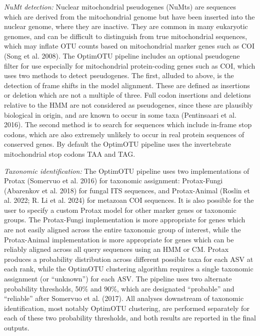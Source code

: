 \documentclass[
]{article}
\begin{document}
\emph{NuMt detection:}
Nuclear mitochondrial pseudogenes (NuMts) are sequences which are derived from the mitochondrial genome but have been inserted into the nuclear genome, where they are inactive.
They are common in many eukaryotic genomes, and can be difficult to distinguish from true mitochondrial sequences, which may inflate OTU counts based on mitochondrial marker genes such as COI (Song et al. 2008).
The OptimOTU pipeline includes an optional pseudogene filter for use especially for mitochondrial protein-coding genes such as COI, which uses two methods to detect pseudogenes.
The first, alluded to above, is the detection of frame shifts in the model alignment.
These are defined as insertions or deletion which are not a multiple of three.
Full codon insertions and deletions relative to the HMM are not considered as pseudogenes, since these are plausibly biological in origin, and are known to occur in some taxa (Pentinsaari et al. 2016).
The second method is to search for sequences which include in-frame stop codons, which are also extremely unlikely to occur in real protein sequences of conserved genes.
By default the OptimOTU pipeline uses the invertebrate mitochondrial stop codons TAA and TAG.

\emph{Taxonomic identification:}
The OptimOTU pipeline uses two implementations of Protax (Somervuo et al. 2016) for taxonomic assignment:
Protax-Fungi (Abarenkov et al. 2018) for fungal ITS sequences, and Protax-Animal (Roslin et al. 2022; R. Li et al. 2024) for metazoan COI sequences.
It is also possible for the user to specify a custom Protax model for other marker genes or taxonomic groups.
The Protax-Fungi implementation is more appropriate for genes which are not easily aligned across the entire taxonomic group of interest, while the Protax-Animal implementation is more appropriate for genes which can be reliably aligned across all query sequences using an HMM or CM.
Protax produces a probability distribution across different possible taxa for each ASV at each rank, while the OptimOTU clustering algorithm requires a single taxonomic assignment (or ``unknown'') for each ASV.
The pipeline uses two alternate probability thresholds, 50\% and 90\%, which are designated ``probable'' and ``reliable'' after Somervuo et al. (2017).
All analyses downstream of taxonomic identification, most notably OptimOTU clustering, are performed separately for each of these two probability thresholds, and both results are reported in the final outputs.
\end{document}
